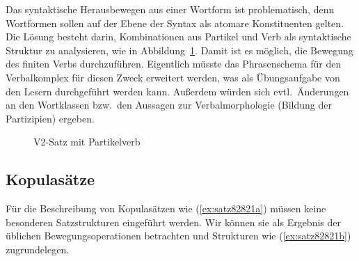 
Das syntaktische Herausbewegen aus einer Wortform ist problematisch, denn Wortformen sollen auf der Ebene der Syntax als atomare Konstituenten gelten.
Die Lösung besteht darin, Kombinationen aus Partikel und Verb als syntaktische Struktur zu analysieren, wie in Abbildung~\ref{fig:v2mitpartikel}.
Damit ist es möglich, die Bewegung des finiten Verbs durchzuführen.
Eigentlich müsste das Phrasenschema für den Verbalkomplex für diesen Zweck erweitert werden, was als Übungsaufgabe von den Lesern durchgeführt werden kann.
Außerdem würden sich evtl.\ Änderungen an den Wortklassen bzw.\ den Aussagen zur Verbalmorphologie (\zB Bildung der Partizipien) ergeben.

\begin{figure}
  \centering
  \vspace{0.3cm}
  \caption{V2-Satz mit Partikelverb}
  \label{fig:v2mitpartikel}
\end{figure}

\subsection{Kopulasätze}

\label{sec:kopulakonstruktionen}


Für die Beschreibung von Kopulasätzen wie (\ref{ex:satz82821a}) müssen keine besonderen Satzstrukturen eingeführt werden.
Wir können sie als Ergebnis der üblichen Bewegungsoperationen betrachten und Strukturen wie (\ref{ex:satz82821b}) zugrundelegen.

\begin{exe}
  \ex\label{ex:satz82821} 
  \begin{xlist}
  \end{xlist}
\end{exe}

